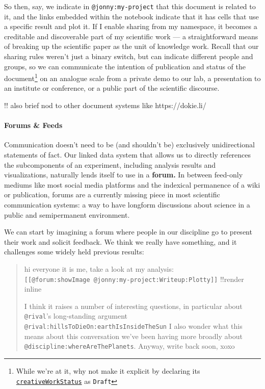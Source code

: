 \documentclass[notoc]{tufte-book}
\begin{document}
So then, say, we indicate in \texttt{@jonny:my-project} that this
document is related to it, and the links embedded within the notebook
indicate that it has cells that use a specific result and plot it. If I
enable sharing from my namespace, it becomes a creditable and
discoverable part of my scientific work --- a straightforward means of
breaking up the scientific paper as the unit of knowledge work. Recall
that our sharing rules weren't just a binary switch, but can indicate
different people and groups, so we can communicate the intention of
publication and status of the document\footnote{While we're at it, why
  not make it explicit by declaring its
  \href{https://schema.org/creativeWorkStatus}{\texttt{creativeWorkStatus}}
  as \texttt{Draft}} on an analogue scale from a private demo to our
lab, a presentation to an institute or conference, or a public part of
the scientific discourse.

!! also brief nod to other document systems like https://dokie.li/


\paragraph{Forums \& Feeds}

Communication doesn't need to be (and shouldn't be) exclusively
unidirectional statements of fact. Our linked data system that allows us
to directly references the subcomponents of an experiment, including
analysis results and visualizations, naturally lends itself to use in a
\textbf{forum.} In between feed-only mediums like most social media
platforms and the indexical permanence of a wiki or publication, forums
are a currently missing piece in most scientific communication systems:
a way to have longform discussions about science in a public and
semipermanent environment.

We can start by imagining a forum where people in our discipline go to
present their work and solicit feedback. We think we really have
something, and it challenges some widely held previous results:

\begin{quote}
hi everyone it is me, take a look at my analysis:
\texttt{{[}{[}@forum:showImage\ @jonny:my-project:Writeup:Plotty{]}{]}}
!!render inline

I think it raises a number of interesting questions, in particular about
\texttt{@rival}'s long-standing argument
\texttt{@rival:hillsToDieOn:earthIsInsideTheSun} I also wonder what this
means about this conversation we've been having more broadly about
\texttt{@discipline:whereAreThePlanets}. Anyway, write back soon, xoxo
\end{quote}
\end{document}
